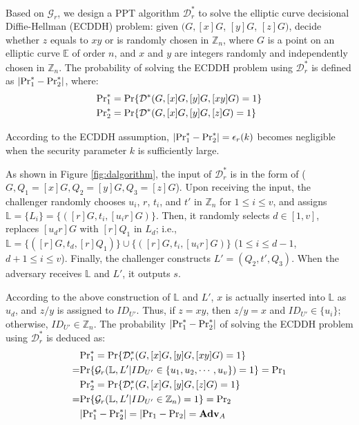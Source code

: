 {Based on $\mathcal{G}_r$, we design a PPT algorithm $\mathcal{D}^*_r$ to solve the elliptic curve decisional Diffie-Hellman (ECDDH) problem:
 given $(G, [x]G$, $[y]G$, $[z]G)$, decide whether $z$ equals to $xy$ or is randomly chosen in $\mathbb{Z}_n$,
    where $G$ is a point on an elliptic curve $\mathbb{E}$ of order $n$, and $x$ and $y$ are integers randomly and independently chosen in $\mathbb{Z}_n$.
The probability of solving the ECDDH problem using $\mathcal{D}^*_r$ is defined as $|{\rm Pr}^*_1 - {\rm Pr}^*_2|$, where:
\vspace{-3mm}
\begin{align*}
&{\rm Pr}^*_1 =  {\rm Pr}\{\mathcal{D}^*(G, [x]G, [y]G, [xy]G)=1\} \\
&{\rm Pr}^*_2 =  {\rm Pr}\{\mathcal{D}^*(G, [x]G, [y]G, [z]G)=1\}
\end{align*}
\vspace{-4mm}

According to the ECDDH assumption,
    $|{\rm Pr}^*_1 - {\rm Pr}^*_2| = \epsilon_{r}(k)$ becomes negligible when the security parameter $k$ is sufficiently large.

As shown in Figure \ref{fig:dalgorithm}, the input of $\mathcal{D}^*_r$ is in the form of ($G, Q_1=[x]G, Q_2=[y]G, Q_3=[z]G$).
Upon receiving the input, the challenger randomly chooses $u_i$, $r$, $t_i$, and $t'$ in $\mathbb{Z}_n$ for $1 \leq i \leq v$, and assigns $\mathbb{L} = \{{L_i}\} = \{([r]G, t_i, [u_ir]G)\}$.
Then, it randomly selects $d \in [1,v]$, replaces $[u_dr]G$ with $[r]Q_1$ in $L_d$; i.e., $\mathbb{L} = \{([r]G, t_d, [r]Q_1)\} \cup \{([r]G, t_i, [u_ir]G)\}$ ($1 \leq i \leq d-1$, $d+1 \leq i \leq v$). Finally, the challenger constructs $L' = (Q_2, t', Q_3)$. When the adversary receives $\mathbb{L}$ and $L'$, it outputs $s$.


According to the above construction of $\mathbb{L}$ and $L'$,
 $x$ is actually inserted into $\mathbb{L}$ as $u_d$, and $z/y$ is assigned to $ID_{U'}$.
Thus, if $z = xy$, then $z/y = x$ and $ID_{U'} \in \{u_i\}$; otherwise, $ID_{U'} \in \mathbb{Z}_n$.
The probability $|{\rm Pr}^*_1 - {\rm Pr}^*_2|$ of solving the ECDDH problem using $\mathcal{D}^*_r$ is deduced as:
\begin{align*}
&{\rm Pr}^*_1 =  {\rm Pr}\{\mathcal{D}^*_r(G, [x]G, [y]G, [xy]G)=1\} \\=&{\rm Pr}\{\mathcal{G}_r(\mathbb{L}, L'|ID_{U'} \in \{u_1, u_2, \cdots, u_v\})=1\} = {\rm Pr}_1 \\
&{\rm Pr}^*_2= {\rm Pr}\{\mathcal{D}^*_r(G, [x]G, [y]G, [z]G)=1\} \\=&  {\rm Pr}\{\mathcal{G}_r(\mathbb{L}, L'|ID_{U'} \in \mathbb{Z}_n)=1\} = {\rm Pr}_2\\
&|{\rm Pr}^*_1-{\rm Pr}^*_2|=|{\rm Pr}_1-{\rm Pr}_2|={\mathbf{Adv}}_{A}
\end{align*}

}
